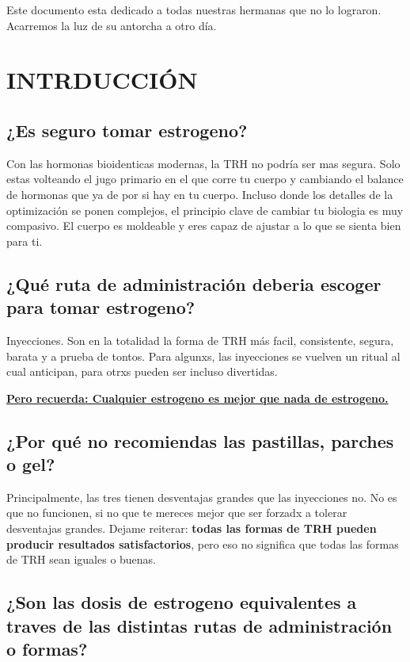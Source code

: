 \documentclass{article}
\begin{document}
Este documento esta dedicado a todas nuestras hermanas que no lo lograron. Acarremos la luz de su antorcha a otro día.


\section{INTRDUCCIÓN}

\subsection{¿Es seguro tomar estrogeno?}

Con las hormonas bioidenticas modernas, la TRH no podría ser mas segura. Solo estas volteando el jugo primario en el que corre tu cuerpo y cambiando el balance de hormonas que ya de por si hay en tu cuerpo. Incluso donde los detalles de la optimización se ponen complejos, el principio clave de cambiar tu biologia es muy compasivo. El cuerpo es moldeable y eres capaz de ajustar a lo que se sienta bien para ti. 

\subsection{¿Qué ruta de administración deberia escoger para tomar estrogeno?}

Inyecciones. Son en la totalidad la forma de TRH más facil, consistente, segura, barata y a prueba de tontos. Para algunxs, las inyecciones se vuelven un ritual al cual anticipan, para otrxs pueden ser incluso divertidas.

\noindent\underline{\textbf{Pero recuerda: Cualquier estrogeno es mejor que nada de estrogeno.}}

\subsection{¿Por qué no recomiendas las pastillas, parches o gel?}

Principalmente, las tres tienen desventajas grandes que las inyecciones no. No es que no funcionen, si no que te mereces mejor que ser forzadx a tolerar desventajas grandes. Dejame reiterar: \textbf{todas las formas de TRH pueden producir resultados satisfactorios}, pero eso no significa que todas las formas de TRH sean iguales o buenas.

\subsection{¿Son las dosis de estrogeno equivalentes a traves de las distintas rutas de administración o formas?}
\end{document}
